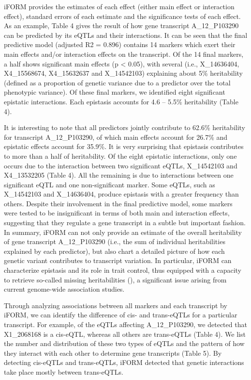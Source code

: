 \documentclass[]{book}
\theoremstyle{definition}
\theoremstyle{definition}
\theoremstyle{remark}
\begin{document}
iFORM provides the estimates of each effect (either main effect or
interaction effect), standard errors of each estimate and the
significance tests of each effect. As an example, Table 4 gives the
result of how gene transcript A\_12\_P103290 can be predicted by its
eQTLs and their interactions. It can be seen that the final predictive
model (adjusted R2 = 0.896) contains 14 markers which exert their main
effects and/or interaction effects on the transcript. Of the 14 final
markers, a half shows significant main effects (p \textless{} 0.05),
with several (i.e., X\_14636404, X4\_15568674, X4\_15632637 and
X\_14542103) explaining about 5\% heritability (defined as a proportion
of genetic variance due to a predictor over the total phenotypic
variance). Of these final markers, we identified eight significant
epistatic interactions. Each epistasis accounts for 4.6 -- 5.5\%
heritability (Table 4).

It is interesting to note that all predictors jointly contribute to
62.6\% heritability for transcript A\_12\_P103290, of which main effects
account for 26.7\% and epistatic effects account for 35.9\%. It is very
surprising that epistasis contributes to more than a half of
heritability. Of the eight epistatic interactions, only one occurs due
to the interaction between two significant eQTLs, X\_14542103 and
X4\_13532205 (Table 4). All the remaining is due to interactions between
one significant eQTL and one non-significant marker. Some eQTLs, such as
X\_14542103 and X\_14636404, produce epistasis with a greater frequency
than others. Despite their involvement in the final predictive model,
some markers were tested to be insignificant in terms of both main and
interaction effects, suggesting that they regulate a gene transcript in
a subtle but important fashion. In summary, iFORM can not only provide
an estimate of the overall heritability of gene transcript
A\_12\_P103290 (i.e., the sum of individual heritabilities explained by
each predictor), but also chart a detailed picture of how each genetic
variant contributes to transcript variation. In particular, iFORM can
characterize epistasis and its role in trait control, thus equipped with
a capacity to retrieve so-called missing heritabilities
(\cite{manolio2009finding}), a significant issue arising from current
genome-wide association studies.

Through analyzing associations between all markers and each transcript
by iFORM, we can identify the difference of cis- and trans-eQTLs for a
particular transcript. For example, of the eQTLs affecting
A\_12\_P103290, we detected that X1\_2068168 is a cis-eQTL, whereas all
others are trans-eQTLs (Table 4). We list the number and distribution of
these two types of eQTLs and the pattern of how they interact with each
other to determine gene transcripts (Table 5). By detecting cis-eQTLs
and trans-eQTLs, iFORM detected that genetic interactions take place
mostly between trans-eQTLs.
\end{document}
